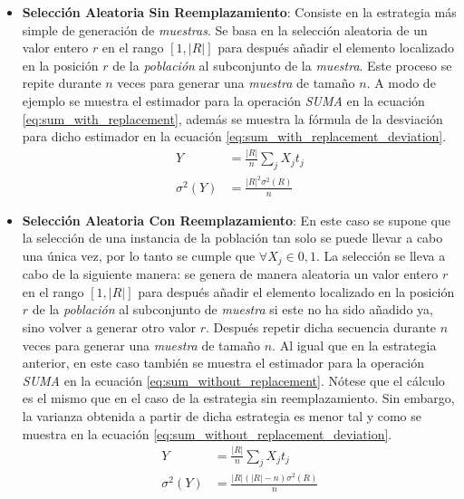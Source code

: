 \documentclass{subfiles}
\begin{document}
        \begin{itemize}

          \item \textbf{Selección Aleatoria Sin Reemplazamiento}: Consiste en la estrategia más simple de generación de \emph{muestras}. Se basa en la selección aleatoria de un valor entero $r$ en el rango $[1, |R|]$ para después añadir el elemento localizado en la posición $r$ de la \emph{población} al subconjunto de la \emph{muestra}. Este proceso se repite durante $n$ veces para generar una \emph{muestra} de tamaño $n$. A modo de ejemplo se muestra el estimador para la operación \emph{SUMA} en la ecuación \eqref{eq:sum_with_replacement}, además se muestra la fórmula de la desviación para dicho estimador en la ecuación \eqref{eq:sum_with_replacement_deviation}.
            \begin{align}
            \label{eq:sum_with_replacement}
              Y &= \frac{|R|}{n}\sum_jX_jt_j \\
            \label{eq:sum_with_replacement_deviation}
              \sigma^2(Y) &= \frac{|R|^2\sigma^2(R)}{n}
            \end{align}

          \item \textbf{Selección Aleatoria Con Reemplazamiento}: En este caso se supone que la selección de una instancia de la población tan solo se puede llevar a cabo una única vez, por lo tanto se cumple que $\forall X_j \in {0,1}$. La selección se lleva a cabo de la siguiente manera: se genera de manera aleatoria un valor entero $r$ en el rango $[1, |R|]$ para después añadir el elemento localizado en la posición $r$ de la \emph{población} al subconjunto de \emph{muestra} si este no ha sido añadido ya, sino volver a generar otro valor $r$. Después repetir dicha secuencia durante $n$ veces para generar una \emph{muestra} de tamaño $n$. Al igual que en la estrategia anterior, en este caso también se muestra el estimador para la operación \emph{SUMA} en la ecuación \eqref{eq:sum_without_replacement}. Nótese que el cálculo es el mismo que en el caso de la estrategia sin reemplazamiento. Sin embargo, la varianza obtenida a partir de dicha estrategia es menor tal y como se muestra en la ecuación \eqref{eq:sum_without_replacement_deviation}.
            \begin{align}
            \label{eq:sum_without_replacement}
              Y &= \frac{|R|}{n}\sum_jX_jt_j \\
            \label{eq:sum_without_replacement_deviation}
              \sigma^2(Y) &= \frac{|R|(|R| - n)\sigma^2(R)}{n}
            \end{align}


\end{itemize}
\end{document}
